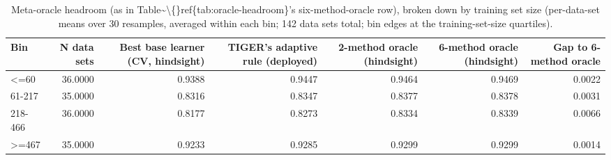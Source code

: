 \begin{table}[t]
\centering
\begin{tabular}{lrrrrrr}
\toprule
Bin & N data sets & Best base learner (CV, hindsight) & TIGER's adaptive rule (deployed) & 2-method oracle (hindsight) & 6-method oracle (hindsight) & Gap to 6-method oracle \\
\midrule
<=60 & 36.0000 & 0.9388 & 0.9447 & 0.9464 & 0.9469 & 0.0022 \\
61-217 & 35.0000 & 0.8316 & 0.8347 & 0.8377 & 0.8378 & 0.0031 \\
218-466 & 36.0000 & 0.8177 & 0.8273 & 0.8334 & 0.8339 & 0.0066 \\
>=467 & 35.0000 & 0.9233 & 0.9285 & 0.9299 & 0.9299 & 0.0014 \\
\bottomrule
\end{tabular}
\caption{Meta-oracle headroom (as in Table\textasciitilde{}\textbackslash\{\}ref\{tab:oracle-headroom\}'s six-method-oracle row), broken down by training set size (per-data-set means over 30 resamples, averaged within each bin; 142 data sets total; bin edges at the training-set-size quartiles).}
\label{tab:oracle-headroom-by-ntrain}
\end{table}
